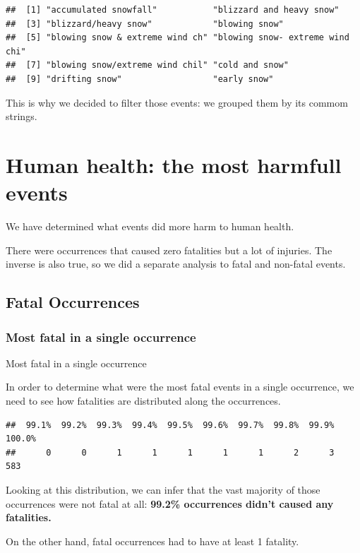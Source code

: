 \documentclass[]{article}
\begin{document}
\begin{verbatim}
##  [1] "accumulated snowfall"           "blizzard and heavy snow"       
##  [3] "blizzard/heavy snow"            "blowing snow"                  
##  [5] "blowing snow & extreme wind ch" "blowing snow- extreme wind chi"
##  [7] "blowing snow/extreme wind chil" "cold and snow"                 
##  [9] "drifting snow"                  "early snow"
\end{verbatim}

This is why we decided to filter those events: we grouped them by its
commom strings.

\section{Human health: the most harmfull
events}\label{human-health-the-most-harmfull-events}

We have determined what events did more harm to human health.

There were occurrences that caused zero fatalities but a lot of
injuries. The inverse is also true, so we did a separate analysis to
fatal and non-fatal events.

\subsection{Fatal Occurrences}\label{fatal-occurrences}

\subsubsection{Most fatal in a single
occurrence}\label{most-fatal-in-a-single-occurrence}

Most fatal in a single occurrence

In order to determine what were the most fatal events in a single
occurrence, we need to see how fatalities are distributed along the
occurrences.

\begin{verbatim}
##  99.1%  99.2%  99.3%  99.4%  99.5%  99.6%  99.7%  99.8%  99.9% 100.0% 
##      0      0      1      1      1      1      1      2      3    583
\end{verbatim}

Looking at this distribution, we can infer that the vast majority of
those occurrences were not fatal at all: \textbf{99.2\% occurrences
didn't caused any fatalities.}

On the other hand, fatal occurrences had to have at least 1 fatality.
\end{document}
